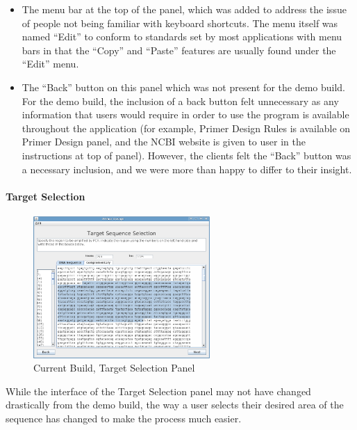\begin{itemize}
\item The menu bar at the top of the panel, which was added to
address the issue of people not being familiar with keyboard
shortcuts.
The menu itself was named ``Edit'' to conform to standards set by most
applications with menu bars in that the ``Copy'' and ``Paste''
features are usually found under the ``Edit'' menu.

\item The ``Back'' button on this panel which was not present for
the demo build.
For the demo build, the inclusion of a back button felt unnecessary as
any information that users would require in order to use the 
program is available throughout the application (for example, Primer Design 
Rules is available on Primer Design panel, and the NCBI website \cite{ncbi}
is given to user in the instructions at top of panel).
However, the clients felt the ``Back'' button was a necessary inclusion, and
we were more than happy to differ to their insight.
\end{itemize}

\paragraph{Target Selection}

\begin{figure}[h]
  \begin{center}
    \includegraphics[width=0.6\textwidth]{./images/currentBuild/areaSelection.png}
    \caption{
      \label{fig:currentBuild:areaSelection}
      Current Build, Target Selection Panel
    }
  \end{center}
\end{figure}

While the interface of the Target Selection panel may not have changed
drastically from the demo build, the way a user selects their desired
area of the sequence has changed to make the process much easier.

